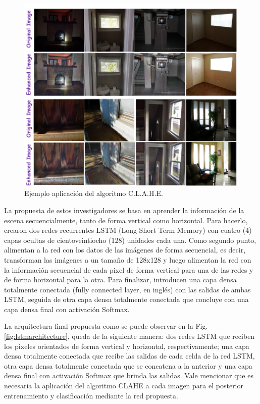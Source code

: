 \begin{figure}[h]
	\centering
	\includegraphics[width=1\linewidth, height=0.5\textheight]{images/lstm_clahe_example}
	\caption[Ejemplo aplicación del algoritmo C.L.A.H.E.]{Ejemplo aplicación del algoritmo C.L.A.H.E.}
	\label{fig:lstmclaheexample}
\end{figure}
La propuesta de estos investigadores se basa en aprender la información de la escena secuencialmente, tanto de forma vertical como horizontal. Para hacerlo, crearon dos redes recurrentes LSTM (Long Short Term Memory) con cuatro (4) capas ocultas de cientoveintiocho (128) unidades cada una. Como segundo punto, alimentan a la red con los datos de las imágenes de forma secuencial, es decir, transforman las imágenes a un tamaño de 128x128 y luego alimentan la red con la información secuencial de cada pixel de forma vertical para una de las redes y de forma horizontal para la otra. Para finalizar, introducen una capa densa totalmente conectada (fully connected layer, en inglés) con las salidas de ambas LSTM, seguida de otra capa densa totalmente conectada que concluye con una capa densa final con activación Softmax.

La arquitectura final propuesta como se puede observar en la Fig. \ref{fig:lstmarchitecture}, queda de la siguiente manera: dos redes LSTM que reciben los pixeles orientados de forma vertical y horizontal, respectivamente; una capa densa totalmente conectada que recibe las salidas de cada celda de la red LSTM, otra capa densa totalmente conectada que se concatena a la anterior y una capa densa final con activación Softmax que brinda las salidas.
Vale mencionar que es necesaria la aplicación del algoritmo CLAHE a cada imagen para el posterior entrenamiento y clasificación mediante la red propuesta.

